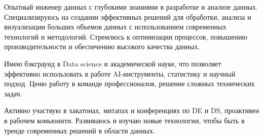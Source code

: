 

\begin{cvparagraph}

Опытный инженер данных с глубокими знаниями в разработке и анализе данных. Специализируюсь на создании эффективных решений для обработки, анализа и визуализации больших объемов данных с использованием современных технологий и методологий. Стремлюсь к оптимизации процессов, повышению производительности и обеспечению высокого качества данных.

Имею бэкграунд в Data science и академической науке, что позволяет эффективно использовать в работе AI-инструменты, статистику и научный подход. Ценю работу в команде профессионалов, решение сложных технических задач.

Активно участвую в хакатонах, митапах и конференциях по DE и DS, проактивен в рабочем комьюнити. Развиваюсь и изучаю новые технологии, чтобы быть в тренде современных решений в области данных.
\end{cvparagraph}
